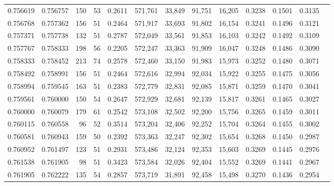 \begin{tabular}{rrrrrrrrrrrrr}
0.756619 & 0.756757 &    150 &    53 &                                     0.2611 & 571,761 &  33,849 &  91,751 &  16,205 & 0.3238 & 0.1501 & 0.3135 \\
0.756768 & 0.757362 &    156 &    51 &                                     0.2464 & 571,917 &  33,693 &  91,802 &  16,154 & 0.3241 & 0.1496 & 0.3121 \\
0.757371 & 0.757738 &    132 &    51 &                                     0.2787 & 572,049 &  33,561 &  91,853 &  16,103 & 0.3242 & 0.1492 & 0.3109 \\
0.757767 & 0.758333 &    198 &    56 &                                     0.2205 & 572,247 &  33,363 &  91,909 &  16,047 & 0.3248 & 0.1486 & 0.3090 \\
0.758333 & 0.758452 &    213 &    74 &                                     0.2578 & 572,460 &  33,150 &  91,983 &  15,973 & 0.3252 & 0.1480 & 0.3071 \\
0.758492 & 0.758991 &    156 &    51 &                                     0.2464 & 572,616 &  32,994 &  92,034 &  15,922 & 0.3255 & 0.1475 & 0.3056 \\
0.758994 & 0.759545 &    163 &    51 &                                     0.2383 & 572,779 &  32,831 &  92,085 &  15,871 & 0.3259 & 0.1470 & 0.3041 \\
0.759561 & 0.760000 &    150 &    54 &                                     0.2647 & 572,929 &  32,681 &  92,139 &  15,817 & 0.3261 & 0.1465 & 0.3027 \\
0.760000 & 0.760079 &    179 &    61 &                                     0.2542 & 573,108 &  32,502 &  92,200 &  15,756 & 0.3265 & 0.1459 & 0.3011 \\
0.760115 & 0.760558 &     96 &    52 &                                     0.3514 & 573,204 &  32,406 &  92,252 &  15,704 & 0.3264 & 0.1455 & 0.3002 \\
0.760581 & 0.760943 &    159 &    50 &                                     0.2392 & 573,363 &  32,247 &  92,302 &  15,654 & 0.3268 & 0.1450 & 0.2987 \\
0.760952 & 0.761497 &    123 &    51 &                                     0.2931 & 573,486 &  32,124 &  92,353 &  15,603 & 0.3269 & 0.1445 & 0.2976 \\
0.761538 & 0.761905 &     98 &    51 &                                     0.3423 & 573,584 &  32,026 &  92,404 &  15,552 & 0.3269 & 0.1441 & 0.2967 \\
0.761905 & 0.762222 &    135 &    54 &                                     0.2857 & 573,719 &  31,891 &  92,458 &  15,498 & 0.3270 & 0.1436 & 0.2954 \\

\end{tabular}
